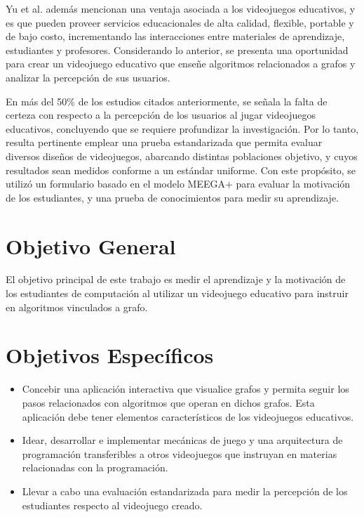 Yu et al. \cite{Yu2020TheEffectsOfEducationGames} además mencionan una ventaja asociada a los videojuegos educativos, y es que pueden proveer servicios educacionales de alta calidad, flexible, portable y de bajo costo, incrementando las interacciones entre materiales de aprendizaje, estudiantes y profesores. Considerando lo anterior, se presenta una oportunidad para crear un videojuego educativo que enseñe algoritmos relacionados a grafos y analizar la percepción de sus usuarios.

En más del 50\% de los estudios citados anteriormente, se señala la falta de certeza con respecto a la percepción de los usuarios al jugar videojuegos educativos, concluyendo que se requiere profundizar la investigación. Por lo tanto, resulta pertinente emplear una prueba estandarizada que permita evaluar diversos diseños de videojuegos, abarcando distintas poblaciones objetivo, y cuyos resultados sean medidos conforme a un estándar uniforme. Con este propósito, se utilizó un formulario basado en el modelo MEEGA+ \cite{meegaplus} para evaluar la motivación de los estudiantes, y una prueba de conocimientos para medir su aprendizaje.


\section{Objetivo General}

El objetivo principal de este trabajo es medir el aprendizaje y la motivación de los estudiantes de computación al utilizar un videojuego educativo para instruir en algoritmos vinculados a grafo.

\section{Objetivos Específicos}

\begin{itemize}

\item Concebir una aplicación interactiva que visualice grafos y permita seguir los pasos relacionados con algoritmos que operan en dichos grafos. Esta aplicación debe tener elementos característicos de los videojuegos educativos.

\item Idear, desarrollar e implementar mecánicas de juego y una arquitectura de programación transferibles a otros videojuegos que instruyan en materias relacionadas con la programación.

\item Llevar a cabo una evaluación estandarizada para medir la percepción de los estudiantes respecto al videojuego creado.

\end{itemize}


